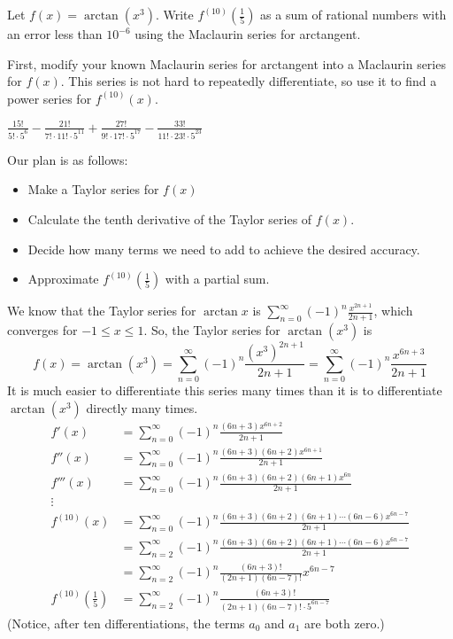\begin{question}
Let $f(x)=\arctan(x^3)$. Write $f^{(10)}\left(\frac{1}{5} \right)$ as a sum of rational numbers with an error less than $10^{-6}$ using the Maclaurin series for arctangent.
\end{question}
\begin{hint}
First, modify your known Maclaurin series for arctangent into a Maclaurin series for $f(x)$. This series is not hard to repeatedly differentiate, so use it to find a power series for $f^{(10)}(x)$.
\end{hint}
\begin{answer}
$\displaystyle \frac{15!}{5!\cdot5^6}-\frac{21!}{7!\cdot 11!\cdot 5^{11}}+\frac{27!}{9!\cdot 17!\cdot 5^{17}}-\frac{33!}{11!\cdot 23!\cdot 5^{23}}$
\end{answer}
\begin{solution}

	Our plan is as follows:
	\begin{itemize}
	\item Make a Taylor series for $f(x)$
	\item Calculate the tenth derivative of the Taylor series of $f(x)$.
	\item Decide how many terms we need to add to achieve the desired accuracy.
	\item Approximate $f^{(10)}\left(\frac15\right)$ with a partial sum.
	\end{itemize}

We know that the Taylor series for $\arctan x$ is $\displaystyle\sum_{n=0}^\infty (-1)^n\frac{x^{2n+1}}{2n+1}$, which converges for $-1\le x\le1$. So, the Taylor series for $\arctan(x^3)$ is
\[f(x)=\arctan(x^3)=\sum_{n=0}^\infty (-1)^n\frac{(x^3)^{2n+1}}{2n+1}
=\sum_{n=0}^\infty (-1)^n\frac{x^{6n+3}}{2n+1}\]
It is much easier to differentiate this series many times than it is to differentiate $\arctan(x^3)$ directly many times.
\begin{align*}
f'(x)&=\sum_{n=0}^\infty (-1)^n\frac{(6n+3)x^{6n+2}}{2n+1}\\
f''(x)&=\sum_{n=0}^\infty (-1)^n\frac{(6n+3)(6n+2)x^{6n+1}}{2n+1}\\
f'''(x)&=\sum_{n=0}^\infty (-1)^n\frac{(6n+3)(6n+2)(6n+1)x^{6n}}{2n+1}\\
\vdots&\\
f^{(10)}(x)&=\sum_{n=0}^\infty (-1)^n\frac{(6n+3)(6n+2)(6n+1)\cdots(6n-6)x^{6n-7}}{2n+1}\\
&=\sum_{n=2}^\infty (-1)^n\frac{(6n+3)(6n+2)(6n+1)\cdots(6n-6)x^{6n-7}}{2n+1}\\
&=\sum_{n=2}^\infty (-1)^n\frac{(6n+3)!}{(2n+1)(6n-7)!}x^{6n-7}\\
f^{(10)}\left(\frac{1}{5}\right)&=\sum_{n=2}^\infty (-1)^n\frac{(6n+3)!}{(2n+1)(6n-7)!\cdot 5^{6n-7}}
\end{align*}
(Notice, after ten differentiations, the terms $a_0$ and $a_1$ are both zero.)


\end{solution}
